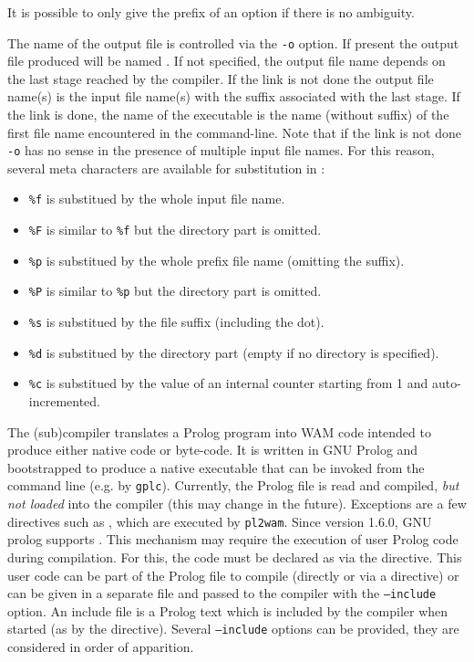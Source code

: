It is possible to only give the prefix of an option if there is no ambiguity.

The name of the output file is controlled via the \texttt{-o}
 option. If present the output file produced will be
named . If not specified, the output file name depends on the
last stage reached by the compiler. If the link is not done the output file
name(s) is the input file name(s) with the suffix associated with the last
stage. If the link is done, the name of the executable is the name (without
suffix) of the first file name encountered in the command-line.  Note that if
the link is not done \texttt{-o} has no sense in the presence of multiple
input file names. For this reason, several meta characters are available for
substitution in :

\begin{itemize}
\item \texttt{\%f} is substitued by the whole input file name.
\item \texttt{\%F} is similar to \texttt{\%f} but the directory part is omitted.
\item \texttt{\%p} is substitued by the whole prefix file name (omitting the suffix).
\item \texttt{\%P} is similar to \texttt{\%p} but the directory part is omitted.
\item \texttt{\%s} is substitued by the file suffix (including the dot).
\item \texttt{\%d} is substitued by the directory part (empty if no directory is specified).
\item \texttt{\%c} is substitued by the value of an internal counter starting from 1 and auto-incremented.
\end{itemize}

\label{pl2wam-description}

The  (sub)compiler translates a Prolog program into WAM code
intended to produce either native code or byte-code. It is written in GNU Prolog
and bootstrapped to produce a native executable that can be invoked from the
command line (e.g. by \texttt{gplc}). Currently, the Prolog file is read and
compiled, \emph{but not loaded} into the compiler (this may change in the
future). Exceptions are a few directives such as ,
 which are executed by \texttt{pl2wam}. Since version
1.6.0, GNU prolog supports . This mechanism may require
the execution of user Prolog code during compilation. For this, the code must be
declared as  via the  directive. This user
code can be part of the Prolog file to compile (directly or via a
 directive) or can be given in a separate file and passed to
the compiler with the \texttt{--include} option. An include file is a Prolog
text which is included by the compiler when started (as by the 
directive). Several \texttt{--include} options can be provided, they are
considered in order of apparition.

